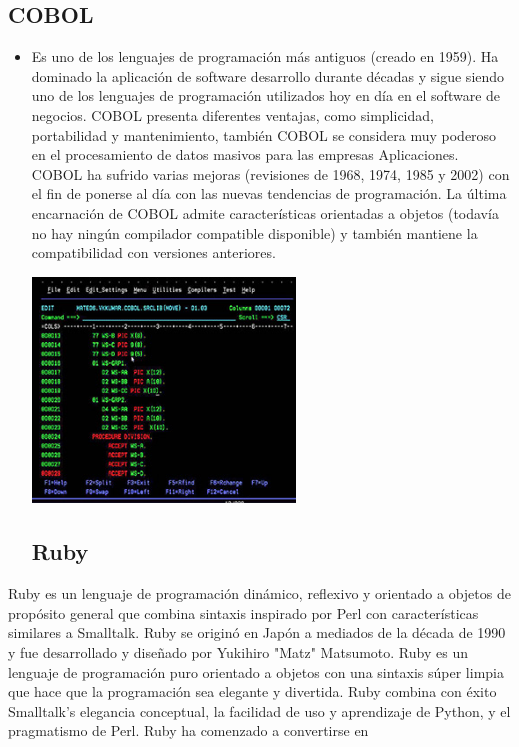 \documentclass[twoside,twocolumn]{article}
\begin{document}
\subsection{COBOL}
\begin{itemize}
\item Es uno de los lenguajes de programación más antiguos (creado en 1959). Ha dominado la aplicación de software
desarrollo durante décadas y sigue siendo uno de los lenguajes de programación utilizados hoy en día en el software de negocios.
COBOL presenta diferentes ventajas, como simplicidad, portabilidad y
mantenimiento, también COBOL se considera muy poderoso en el procesamiento de datos masivos para las empresas Aplicaciones. COBOL ha sufrido varias mejoras (revisiones de 1968, 1974, 1985 y 2002) con el fin de ponerse al día con las nuevas tendencias de programación. La última encarnación de COBOL admite características orientadas a objetos
(todavía no hay ningún compilador compatible disponible) y también mantiene la compatibilidad con versiones anteriores.
\begin{center}
	\includegraphics[width=7cm]{./Imagenes/3} 
	\end{center}
\subsection{Ruby}
\end{itemize}
Ruby es un lenguaje de programación dinámico, reflexivo y orientado a objetos de propósito general que combina sintaxis
inspirado por Perl con características similares a Smalltalk. Ruby se originó en Japón a mediados de la década de 1990 y fue
desarrollado y diseñado por Yukihiro "Matz" Matsumoto. Ruby es un lenguaje de programación puro orientado a objetos
con una sintaxis súper limpia que hace que la programación sea elegante y divertida. Ruby combina con éxito Smalltalk's
elegancia conceptual, la facilidad de uso y aprendizaje de Python, y el pragmatismo de Perl. Ruby ha comenzado a convertirse en
\end{document}

